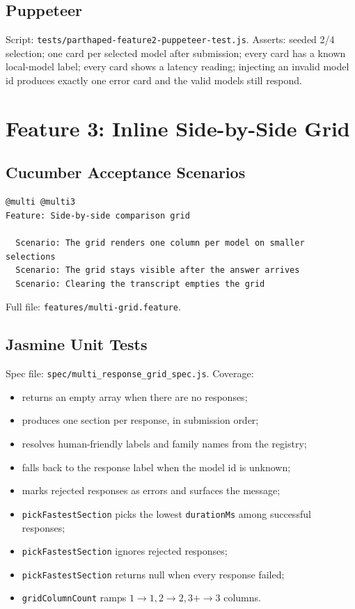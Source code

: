 \documentclass[11pt]{article}
\begin{document}
\subsection{Puppeteer}

Script: \texttt{tests/parthaped-feature2-puppeteer-test.js}.
Asserts: seeded 2/4 selection; one card per selected model after
submission; every card has a known local-model label; every card
shows a latency reading; injecting an invalid model id produces
exactly one error card and the valid models still respond.

\section{Feature 3: Inline Side-by-Side Grid}

\subsection{Cucumber Acceptance Scenarios}

\begin{lstlisting}
@multi @multi3
Feature: Side-by-side comparison grid

  Scenario: The grid renders one column per model on smaller selections
  Scenario: The grid stays visible after the answer arrives
  Scenario: Clearing the transcript empties the grid
\end{lstlisting}

Full file: \texttt{features/multi-grid.feature}.

\subsection{Jasmine Unit Tests}

Spec file: \texttt{spec/multi\_response\_grid\_spec.js}.  Coverage:

\begin{itemize}[leftmargin=*]
  \item returns an empty array when there are no responses;
  \item produces one section per response, in submission order;
  \item resolves human-friendly labels and family names from the
    registry;
  \item falls back to the response label when the model id is unknown;
  \item marks rejected responses as errors and surfaces the message;
  \item \texttt{pickFastestSection} picks the lowest \texttt{durationMs}
    among successful responses;
  \item \texttt{pickFastestSection} ignores rejected responses;
  \item \texttt{pickFastestSection} returns null when every response
    failed;
  \item \texttt{gridColumnCount} ramps \(1\to1, 2\to2, 3+\to3\)
    columns.
\end{itemize}
\end{document}
